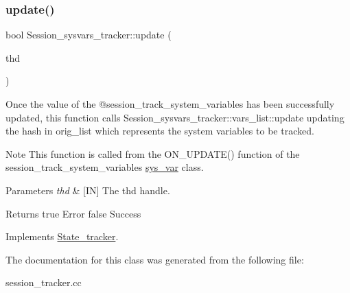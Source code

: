 \subsubsection{\texorpdfstring{update()}{update()}}
{\footnotesize\ttfamily bool Session\+\_\+sysvars\+\_\+tracker\+::update (\begin{DoxyParamCaption}\item[{T\+HD $\ast$}]{thd }\end{DoxyParamCaption})\hspace{0.3cm}{\ttfamily [virtual]}}



Once the value of the @session\+\_\+track\+\_\+system\+\_\+variables has been successfully updated, this function calls Session\+\_\+sysvars\+\_\+tracker\+::vars\+\_\+list\+::update updating the hash in orig\+\_\+list which represents the system variables to be tracked. 

\begin{DoxyNote}{Note}
This function is called from the O\+N\+\_\+\+U\+P\+D\+A\+T\+E() function of the session\+\_\+track\+\_\+system\+\_\+variables\textquotesingle{} \mbox{\hyperlink{classsys__var}{sys\+\_\+var}} class.
\end{DoxyNote}

\begin{DoxyParams}{Parameters}
{\em thd} & \mbox{[}IN\mbox{]} The thd handle.\\
\hline
\end{DoxyParams}
\begin{DoxyReturn}{Returns}
true Error false Success 
\end{DoxyReturn}


Implements \mbox{\hyperlink{classState__tracker_a74ffdcb79733e8d31e9fe2dcae346022}{State\+\_\+tracker}}.



The documentation for this class was generated from the following file\+:\begin{DoxyCompactItemize}
\item 
session\+\_\+tracker.\+cc\end{DoxyCompactItemize}

